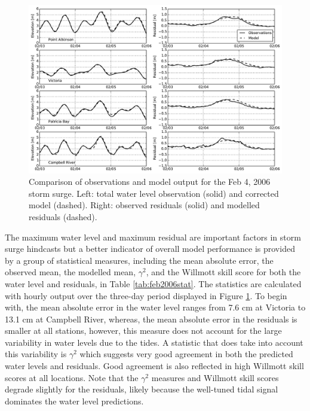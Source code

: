 \documentclass[pdftex,10pt]{article}
\begin{document}
\begin{figure}
\centering
\includegraphics[scale=0.6]{Figures/feb2006.pdf}
\caption{Comparison of observations and model output for the Feb 4, 2006 storm surge. Left: total water level observation (solid) and corrected model (dashed). Right: observed residuals (solid) and modelled residuals (dashed).}
\label{fig:feb2006}
\end{figure}

The maximum water level and maximum residual are important factors in storm surge hindcasts but a better indicator of overall model performance is provided by a group of statistical measures, including the mean absolute error, the observed mean, the modelled mean, $\gamma^2$, and the Willmott skill score for both the water level and residuals, in Table \ref{tab:feb2006stat}. The statistics are calculated with hourly output over the three-day period displayed in Figure \ref{fig:feb2006}. To begin with, the mean absolute error in the water level ranges from 7.6 cm at Victoria to 13.1 cm at Campbell River, whereas, the mean absolute error in the residuals is smaller at all stations, however, this measure does not account for the large variability in water levels due to the tides. A statistic that does take into account this variability is $\gamma^2$ which suggests very good agreement in both the predicted water levels and residuals. Good agreement is also reflected in high Willmott skill scores at all locations. Note that the $\gamma^2$ measures and Willmott skill scores degrade slightly for the residuals, likely because the well-tuned tidal signal dominates the water level predictions.
\end{document}
